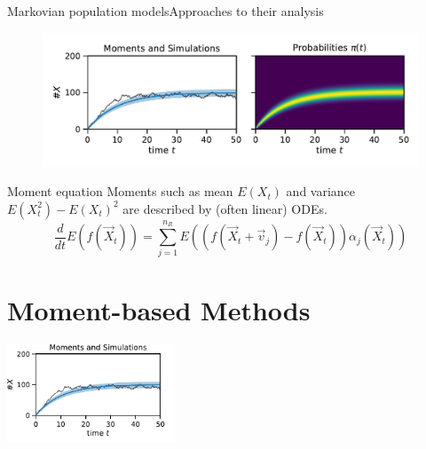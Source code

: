 \documentclass[9pt]{beamer}
\newcommand{\expSym}{{E}}
\newcommand{\E}[1]{\ensuremath{\expSym\left(#1\right)}}
\begin{document}
\begin{frame}{Markovian population models}{Approaches to their analysis}
    \begin{figure}
        \centering
    \includegraphics[scale=.45]{../gfx/momsandprobs.pdf}
    \end{figure}
          \begin{block}{Moment equation}
              Moments such as mean $\E{X_t}$ and variance $\E{X_t^2}-\E{X_t}^2$ are described by (often {linear}) ODEs.
        \begin{equation*}
            \frac{d}{dt}\E{f({\vec{ X}}_t)} = \sum_{j=1}^{n_R}\E{\left(f({\vec X_t +
            \vec{v}_j}) - f(\vec X_t)\right)\alpha_j(\vec X_t)}
        \end{equation*}
          \end{block}
\end{frame}

\section{Moment-based Methods}
\begin{frame}
  \vfill
  \centering
    \insertsectionhead\par%
    \vspace{1cm}
    \includegraphics[width=5cm]{../gfx/momsandsims.pdf}
  \vfill
\end{frame}
\end{document}

